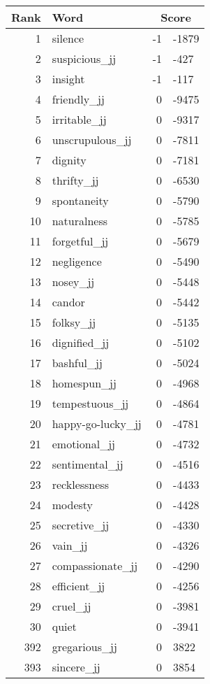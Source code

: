 \begin{longtable}[!htbp]{| rlr@{.}l |}
    \hline
    \textbf{Rank} & \textbf{Word} & \multicolumn{2}{c|}{\textbf{Score}} \\
    \hline
    \endhead
    1 & silence & -1 & -1879 \\
    2 & suspicious\_jj & -1 & -427 \\
    3 & insight & -1 & -117 \\
    4 & friendly\_jj & 0 & -9475 \\
    5 & irritable\_jj & 0 & -9317 \\
    6 & unscrupulous\_jj & 0 & -7811 \\
    7 & dignity & 0 & -7181 \\
    8 & thrifty\_jj & 0 & -6530 \\
    9 & spontaneity & 0 & -5790 \\
    10 & naturalness & 0 & -5785 \\
    11 & forgetful\_jj & 0 & -5679 \\
    12 & negligence & 0 & -5490 \\
    13 & nosey\_jj & 0 & -5448 \\
    14 & candor & 0 & -5442 \\
    15 & folksy\_jj & 0 & -5135 \\
    16 & dignified\_jj & 0 & -5102 \\
    17 & bashful\_jj & 0 & -5024 \\
    18 & homespun\_jj & 0 & -4968 \\
    19 & tempestuous\_jj & 0 & -4864 \\
    20 & happy-go-lucky\_jj & 0 & -4781 \\
    21 & emotional\_jj & 0 & -4732 \\
    22 & sentimental\_jj & 0 & -4516 \\
    23 & recklessness & 0 & -4433 \\
    24 & modesty & 0 & -4428 \\
    25 & secretive\_jj & 0 & -4330 \\
    26 & vain\_jj & 0 & -4326 \\
    27 & compassionate\_jj & 0 & -4290 \\
    28 & efficient\_jj & 0 & -4256 \\
    29 & cruel\_jj & 0 & -3981 \\
    30 & quiet & 0 & -3941 \\
    392 & gregarious\_jj & 0 & 3822 \\
    393 & sincere\_jj & 0 & 3854 \\

\end{longtable}
